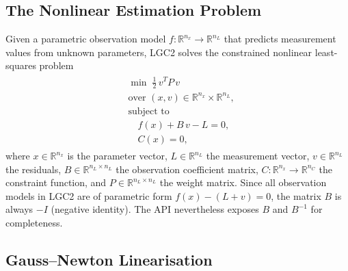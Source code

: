 \documentclass[a4paper,11pt]{article}
\begin{document}
\subsection{The Nonlinear Estimation Problem}

Given a parametric observation model $f\colon \mathbb{R}^{n_x} \to
\mathbb{R}^{n_L}$ that predicts measurement values from unknown
parameters, LGC2 solves the constrained nonlinear least-squares problem
\begin{align}
  \begin{split}
    & \min \;\tfrac{1}{2}\, v^T P\, v \\
    & \text{over } (x, v) \in \mathbb{R}^{n_x} \times \mathbb{R}^{n_L}, \\
    & \text{subject to} \\
    & \quad f(x) + B\,v - L = 0, \\
    & \quad C(x) = 0,
  \end{split}
  \label{eq:pe_problem}
\end{align}
where $x \in \mathbb{R}^{n_x}$ is the parameter vector,
$L \in \mathbb{R}^{n_L}$ the measurement vector,
$v \in \mathbb{R}^{n_L}$ the residuals,
$B \in \mathbb{R}^{n_L \times n_L}$ the observation coefficient matrix,
$C\colon \mathbb{R}^{n_x} \to \mathbb{R}^{n_C}$ the constraint function,
and $P \in \mathbb{R}^{n_L \times n_L}$ the weight matrix.
Since all observation models in LGC2 are of parametric form
$f(x) - (L + v) = 0$, the matrix $B$ is always $-I$ (negative identity).
The API nevertheless exposes $B$ and $B^{-1}$ for completeness.

\subsection{Gauss--Newton Linearisation}
\end{document}
